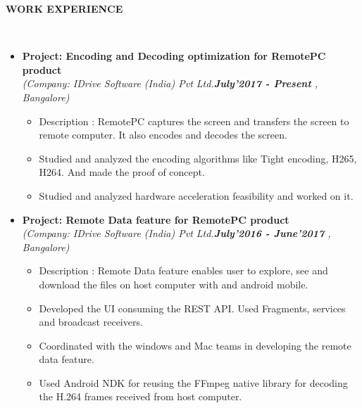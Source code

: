 \documentclass[a4paper,10pt]{article}
\newcommand{\isep}{-2 pt}
\newcommand{\lsep}{-0.5cm}
\newcommand{\resheading}[1]{{\small \colorbox{mygrey}{\begin{minipage}{0.975\textwidth}{\textbf{#1 \vphantom{p\^{E}}}}\end{minipage}}}}
\begin{document}
\resheading{\textbf{WORK EXPERIENCE} }\\[\lsep]
\begin{itemize}

    \item \textbf{Project: Encoding and Decoding optimization for RemotePC product} \\
    \emph{(Company: IDrive Software (India) Pvt Ltd.\textbf{July’2017 - Present} , Bangalore)} \\[-0.6cm] 
	\begin{itemize}\itemsep \isep
	
	    \item Description : RemotePC captures the screen and transfers the screen to remote computer. It also encodes and decodes the screen.
	    \item Studied and analyzed the encoding algorithms like Tight encoding, H265, H264. And made the proof of concept.
	    \item Studied and analyzed hardware acceleration feasibility and worked on it.

	\end{itemize}
	
    \item \textbf{Project: Remote Data feature for RemotePC product} \\
    \emph{(Company: IDrive Software (India) Pvt Ltd.\textbf{July’2016 - June’2017} , Bangalore)} \\[-0.6cm] 
	\begin{itemize}\itemsep \isep
	
	    \item Description : Remote Data feature enables user to explore, see and download the  files on host computer with and android mobile.
	    \item Developed the UI consuming the REST API. Used Fragments, services and  broadcast receivers.
	    \item Coordinated with the windows and Mac teams in developing the remote data feature.
        \item Used Android NDK for reusing the FFmpeg native library for decoding the H.264 frames received from host computer.

	\end{itemize}
\end{itemize}
\end{document}
